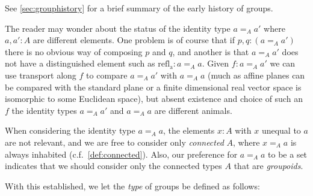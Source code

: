 See \cref{sec:grouphistory} for a brief summary of the early history of groups.
\begin{remark}
  The reader may wonder about the status of the identity type $a=_Aa'$ where $a,a':A$ are different elements.  One problem is of course that if $p,q:(a=_Aa')$ there is no obvious way of composing $p$ and $q$, and another is that $a=_Aa'$ does not have a distinguished element such as $\mathrm{refl{}_a}:a=_Aa$.
Given $f:a=_Aa'$ we can use transport along $f$ to compare $a=_Aa'$ with $a=_Aa$ (much as affine planes can be compared with the standard plane or a finite dimensional real vector space is isomorphic to some Euclidean space), but absent existence and choice of such an $f$ the identity types $a=_Aa'$ and $a=_Aa$ are different animals.
\end{remark}


\begin{remark}
  When considering the identity type $a=_Aa$, the elements $x:A$ with $x$ unequal to $a$ are not relevant, and we are free to consider only \emph{connected} $A$, \ie where $x=_Aa$ is always inhabited (c.f.~\cref{def:connected}).  Also, our preference for $a=_Aa$ to be a set indicates that we should consider only the connected types $A$ that are \emph{groupoids}.
\end{remark}


With this established, we let the \emph{type} of groups be defined as follows:

